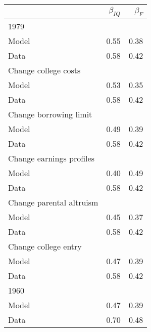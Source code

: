 \begin{tabular}{lrr}
\hline
  & $\beta_{IQ}$  & $\beta_{F}$  \\ 
\hline
1979 &   &   \\ 
Model & 0.55  & 0.38  \\ 
Data & 0.58  & 0.42  \\ 
Change college costs &   &   \\ 
Model & 0.53  & 0.35  \\ 
Data & 0.58  & 0.42  \\ 
Change borrowing limit &   &   \\ 
Model & 0.49  & 0.39  \\ 
Data & 0.58  & 0.42  \\ 
Change earnings profiles &   &   \\ 
Model & 0.40  & 0.49  \\ 
Data & 0.58  & 0.42  \\ 
Change parental altruism &   &   \\ 
Model & 0.45  & 0.37  \\ 
Data & 0.58  & 0.42  \\ 
Change college entry &   &   \\ 
Model & 0.47  & 0.39  \\ 
Data & 0.58  & 0.42  \\ 
1960 &   &   \\ 
Model & 0.47  & 0.39  \\ 
Data & 0.70  & 0.48  \\ 
\hline
\end{tabular}%
